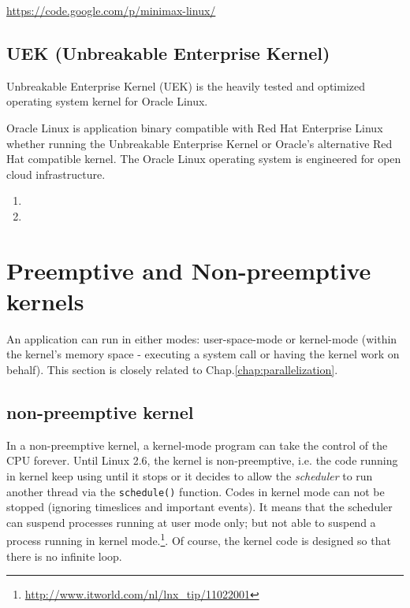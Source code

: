 \url{https://code.google.com/p/minimax-linux/}

\subsection{UEK (Unbreakable Enterprise Kernel)}
\label{sec:UEK-Unbreakable-Enterprise-Kernel}

Unbreakable Enterprise Kernel (UEK) is the heavily tested and optimized
operating system kernel for Oracle Linux.

Oracle Linux is application binary compatible with Red Hat Enterprise Linux
whether running the Unbreakable Enterprise Kernel or Oracle's alternative Red
Hat compatible kernel. The Oracle Linux operating system is engineered for open
cloud infrastructure.


\begin{enumerate}
  \item  
  
  \item 
\end{enumerate}


 

\section{Preemptive and Non-preemptive kernels}

An application can run in either modes: user-space-mode or kernel-mode (within
the kernel's memory space - executing a system call or having the kernel work on
behalf). This section is closely related to Chap.\ref{chap:parallelization}.

\subsection{non-preemptive kernel}
\label{sec:nonpreemptive-kernel}

In a non-preemptive kernel, a kernel-mode program can take the control of the
CPU forever.
Until Linux 2.6, the kernel is non-preemptive, i.e. the code running in kernel
keep using until it stops or it decides to allow the {\it scheduler} to run
another thread via the \verb!schedule()! function. Codes in kernel mode can not
be stopped (ignoring timeslices and important events). It means that the
scheduler can suspend processes running at user mode only; but
not able to suspend a process running in kernel
mode.\footnote{\url{http://www.itworld.com/nl/lnx_tip/11022001}}. Of course, the
kernel code is designed so that there is no infinite loop.

